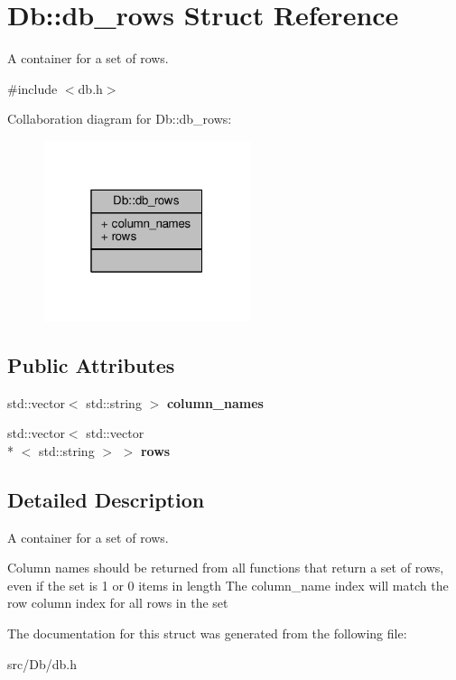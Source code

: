 \hypertarget{structDb_1_1db__rows}{\section{Db\-:\-:db\-\_\-rows Struct Reference}
\label{structDb_1_1db__rows}
}


A container for a set of rows.  




{\ttfamily \#include $<$db.\-h$>$}



Collaboration diagram for Db\-:\-:db\-\_\-rows\-:
\nopagebreak
\begin{figure}[H]
\begin{center}
\leavevmode
\includegraphics[width=172pt]{structDb_1_1db__rows__coll__graph}
\end{center}
\end{figure}
\subsection*{Public Attributes}
\begin{DoxyCompactItemize}
\item 
\hypertarget{structDb_1_1db__rows_ab5535960fe60a5b2e1a3c29883fb0828}{std\-::vector$<$ std\-::string $>$ {\bfseries column\-\_\-names}}\label{structDb_1_1db__rows_ab5535960fe60a5b2e1a3c29883fb0828}

\item 
\hypertarget{structDb_1_1db__rows_ad0e34a95070703cf4f46798b60ca2986}{std\-::vector$<$ std\-::vector\\*
$<$ std\-::string $>$ $>$ {\bfseries rows}}\label{structDb_1_1db__rows_ad0e34a95070703cf4f46798b60ca2986}

\end{DoxyCompactItemize}


\subsection{Detailed Description}
A container for a set of rows. 

Column names should be returned from all functions that return a set of rows, even if the set is 1 or 0 items in length The column\-\_\-name index will match the row column index for all rows in the set 

The documentation for this struct was generated from the following file\-:\begin{DoxyCompactItemize}
\item 
src/\-Db/db.\-h\end{DoxyCompactItemize}
